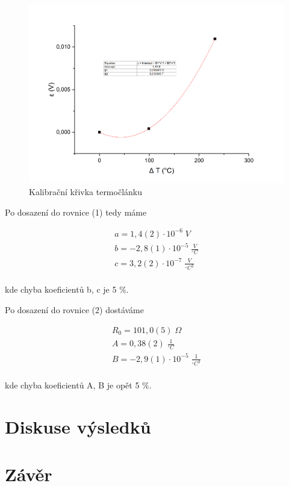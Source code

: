 \begin{figure}[h]
    \centering
    \includegraphics[width=0.8\linewidth]{8 - Kalibrace odporového teploměru a termočlánku//Prototkol - kalibrace teploměru//img/Závislost epsilon na delta T, parabola.png}
    \caption{Kalibrační křivka termočlánku}
    \label{fig:krivka-termoclanek}
\end{figure}

Po dosazení do rovnice (1) tedy máme

\begin{align*}
    a = 1,4(2) \cdot 10^{-6} \; V\\
    b = -2,8(1) \cdot 10^{-5} \; \frac{V}{^\circ C}\\
    c = 3,2(2) \cdot 10^{-7} \; \frac{V}{^\circ C^2} \\
\end{align*}

kde chyba koeficientů b, c je 5 \%.

Po dosazení do rovnice (2) dostáváme

\begin{align*}
    R_0 = 101,0(5) \; \Omega \\
    A = 0,38(2) \; \frac{1}{^\circ C} \\
    B = -2,9(1) \cdot 10^{-5} \; \frac{1}{^\circ C^2} \\
\end{align*}

kde chyba koeficientů A, B je opět 5 \%.

\newpage
\section{Diskuse výsledků}

\section{Závěr}
